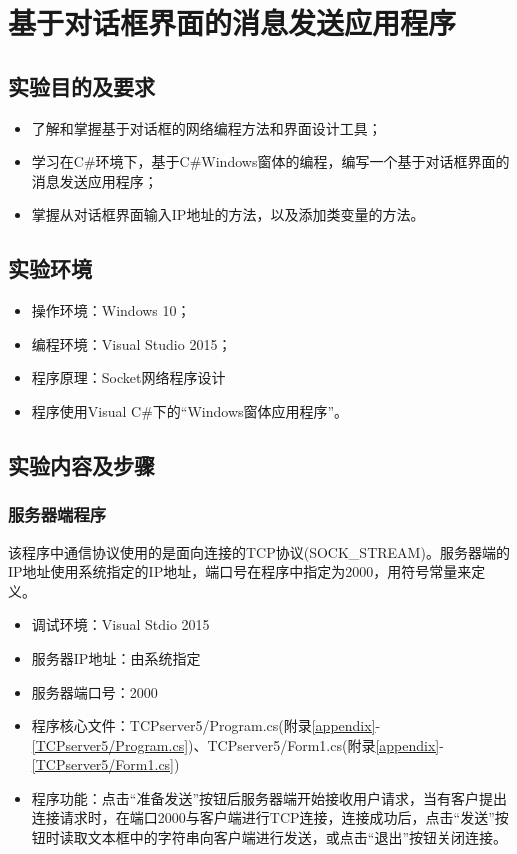 \documentclass[a4paper]{ctexrep}
\begin{document}
\chapter{基于对话框界面的消息发送应用程序}
\begin{spacing}{1.5}
\songti{}
\section{实验目的及要求}
\begin{itemize}
	\item 了解和掌握基于对话框的网络编程方法和界面设计工具；
	\item 学习在C\#环境下，基于C\#Windows窗体的编程，编写一个基于对话框界面的消息发送应用程序；
	\item 掌握从对话框界面输入IP地址的方法，以及添加类变量的方法。
\end{itemize}
\section{实验环境}
\begin{itemize}
	\item 操作环境：Windows 10；
	\item 编程环境：Visual Studio 2015；
	\item 程序原理：Socket网络程序设计
	\item 程序使用Visual C\#下的“Windows窗体应用程序”。
\end{itemize}
\section{实验内容及步骤}
\subsection{服务器端程序}
该程序中通信协议使用的是面向连接的TCP协议(SOCK\_STREAM)。服务器端的IP地址使用系统指定的IP地址，端口号在程序中指定为2000，用符号常量来定义。
\begin{itemize}
	\item 调试环境：Visual Stdio 2015
	\item 服务器IP地址：由系统指定
	\item 服务器端口号：2000
	\item 程序核心文件：TCPserver5/Program.cs(附录\ref{appendix}-\ref{TCPserver5/Program.cs})、TCPserver5/Form1.cs(附录\ref{appendix}-\ref{TCPserver5/Form1.cs})
	\item 程序功能：点击“准备发送”按钮后服务器端开始接收用户请求，当有客户提出连接请求时，在端口2000与客户端进行TCP连接，连接成功后，点击“发送”按钮时读取文本框中的字符串向客户端进行发送，或点击“退出”按钮关闭连接。
\end{itemize}

\end{spacing}
\end{document}
